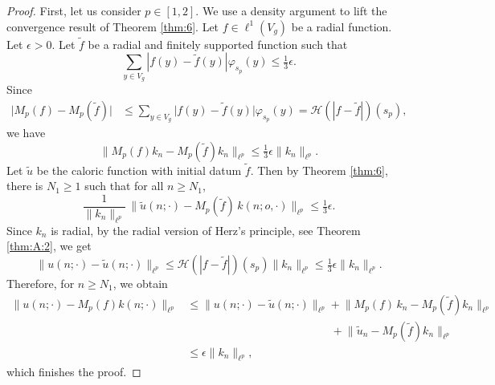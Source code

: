 \documentclass[11pt]{amsart}
\newcommand{\calH}{\mathcal{H}}
\newcommand{\vphi}{\varphi}
\theoremstyle{plain}
\newcounter{thm}
\theoremstyle{definition}
\numberwithin{equation}{section}
\begin{document}
\begin{proof}
	First, let us consider $p \in [1, 2]$. We use a density argument to lift the convergence result of Theorem \ref{thm:6}. 
	Let $f \in \ell^1(V_g)$ be a radial function. Let $\epsilon > 0$. Let $\tilde{f}$ be a radial and finitely supported 
	function such that
	\[
		\sum_{y \in V_g} |f(y) - \tilde{f}(y)| \vphi_{s_p}(y) \leqslant \tfrac{1}{3} \epsilon.
	\]
	Since
	\begin{align*}
		\big| M_p(f)-M_p(\tilde{f}) \big| 
		&\leqslant 
		\sum_{y \in V_g} \big|f(y) - \tilde{f}(y)\big| \vphi_{s_p}(y) = \calH(|f - \tilde{f}|)(s_p) ,
	\end{align*}
	we have
	\[
		\big\|M_p(f) k_n - M_p(\tilde{f}) k_n\|_{\ell^p} \leqslant \tfrac{1}{3} \epsilon \|k_n\|_{\ell^p}.
	\]
	Let $\tilde{u}$ be the caloric function with initial datum $\tilde{f}$.
	Then by Theorem \ref{thm:6}, there is $N_1 \geqslant 1$ such that for all $n \geqslant N_1$,
	\[
		\frac{1}{\|k_n\|_{\ell^p}} \,\|\tilde{u}(n; \cdot)-M_p(\tilde{f}) \, k(n;o, \cdot) \|_{\ell^p}
		\leqslant \tfrac{1}{3} \epsilon.
	\]
	Since $k_n$ is radial, by the radial version of Herz's principle, see Theorem \ref{thm:A:2}, we get
	\[
		\big\|u(n;\cdot)-\tilde{u}(n;\cdot)\big\|_{\ell^p}
		\leqslant
		\calH (|f - \tilde{f}|)(s_p) \|k_n\|_{\ell^p} 
		\leqslant 
		\tfrac{1}{3} \epsilon \|k_n\|_{\ell^p}.
	\]
	Therefore, for $n \geqslant N_1$, we obtain
	\begin{align*}
		\big\|u(n; \cdot) - M_p(f) k(n; \cdot) \big\|_{\ell^p}
		&\leqslant
		\big\|u(n;\cdot)-\tilde{u}(n;\cdot)\big\|_{\ell^p}
		+\big\|M_{p}(f)\, k_n - M_p(\tilde{f}) k_n\big\|_{\ell^p} \\
		&\phantom{\leqslant \big\|u(n;\cdot)-\tilde{u}(n;\cdot)\big\|_{\ell^p} \ }
		+\big\|\tilde{u}_n - M_p(\tilde{f}) k_n \|_{\ell^p} \\
		&\leqslant \epsilon \|k_n\|_{\ell^p},
	\end{align*}
	which finishes the proof.


\end{proof}
\end{document}

